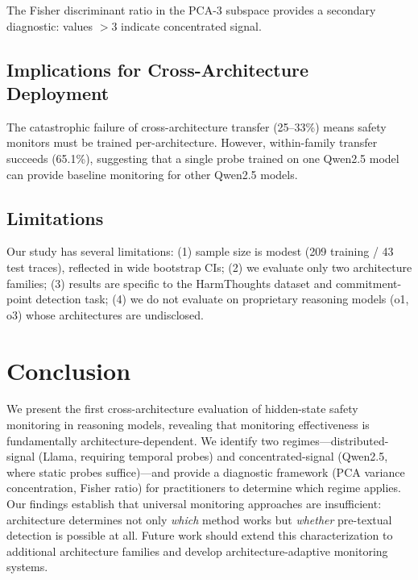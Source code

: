 \documentclass[11pt]{article}
\begin{document}
The Fisher discriminant ratio in the PCA-3 subspace provides a secondary diagnostic: values $> 3$ indicate concentrated signal.

\subsection{Implications for Cross-Architecture Deployment}

The catastrophic failure of cross-architecture transfer (25--33\%) means safety monitors must be trained per-architecture. However, within-family transfer succeeds (65.1\%), suggesting that a single probe trained on one Qwen2.5 model can provide baseline monitoring for other Qwen2.5 models.

\subsection{Limitations}

Our study has several limitations: (1) sample size is modest (209 training / 43 test traces), reflected in wide bootstrap CIs; (2) we evaluate only two architecture families; (3) results are specific to the HarmThoughts dataset and commitment-point detection task; (4) we do not evaluate on proprietary reasoning models (o1, o3) whose architectures are undisclosed.

\section{Conclusion}

We present the first cross-architecture evaluation of hidden-state safety monitoring in reasoning models, revealing that monitoring effectiveness is fundamentally architecture-dependent. We identify two regimes---distributed-signal (Llama, requiring temporal probes) and concentrated-signal (Qwen2.5, where static probes suffice)---and provide a diagnostic framework (PCA variance concentration, Fisher ratio) for practitioners to determine which regime applies. Our findings establish that universal monitoring approaches are insufficient: architecture determines not only \emph{which} method works but \emph{whether} pre-textual detection is possible at all. Future work should extend this characterization to additional architecture families and develop architecture-adaptive monitoring systems.
\end{document}

